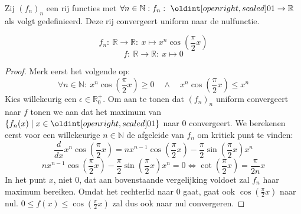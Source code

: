 \documentclass[main.tex]{subfiles}
\begin{document}
\begin{vb}
  Zij $(f_{n})_{n}$ een rij functies met $\forall n\in\mathbb{N}: f_{n}:\ \interval[open right]{0}{1}\rightarrow \mathbb{R}$ als volgt gedefinieerd.
  Deze rij convergeert uniform naar de nulfunctie.

  \noindent
  \begin{minipage}{.45\textwidth}
    \begin{figure}[H]
      \centering
    \end{figure}
  \end{minipage}
  \begin{minipage}{.45\textwidth}
    \[ f_{n}:\ \mathbb{R} \rightarrow \mathbb{R}:\ x \mapsto x^{n}\cos\left(\frac{\pi}{2}x\right) \]
    \[ f:\ \mathbb{R} \rightarrow \mathbb{R}:\ x \mapsto 0 \]
  \end{minipage}
  
  \begin{proof}
    Merk eerst het volgende op:
    \[ \forall n\in\mathbb{N}:\ x^{n}\cos\left(\frac{\pi}{2}x\right) \ge 0 \quad\wedge\quad x^{n}\cos\left(\frac{\pi}{2}x\right) \le x^{n} \]
    Kies willekeurig een $\epsilon \in\mathbb{R}_{0}^{+}$.
    Om aan te tonen dat $(f_{n})_{n}$ uniform convergeert naar $f$ tonen we aan dat het maximum van $\{f_{n}(x) \mid x\in\interval[open right]{0}{1}\}$ naar $0$ convergeert.
    We berekenen eerst voor een willekeurige $n\in\mathbb{N}$ de afgeleide van $f_{n}$ om kritiek punt te vinden:
    \[ \frac{d}{dx}x^{n}\cos\left(\frac{\pi}{2}x\right) = nx^{n-1}\cos\left(\frac{\pi}{2}x\right) - \frac{\pi}{2}\sin\left(\frac{\pi}{2}x\right)x^{n} \]
    \[
    nx^{n-1}\cos\left(\frac{\pi}{2}x\right) - \frac{\pi}{2}\sin\left(\frac{\pi}{2}x\right)x^{n} = 0 
    \Leftrightarrow
    \cot\left(\frac{\pi}{2}x\right) = \frac{\pi}{2n}x 
    \]
    In het punt $x$, niet $0$, dat aan bovenstaande vergelijking voldoet zal $f_{n}$ haar maximum bereiken.
    Omdat het rechterlid naar $0$ gaat, gaat ook $\cos\left(\frac{\pi}{2}x\right)$ naar nul.
    $0 \le f(x) \le \cos\left(\frac{\pi}{2}x\right)$ zal dus ook naar nul convergeren.
  \end{proof}
\end{vb}
\end{document}
